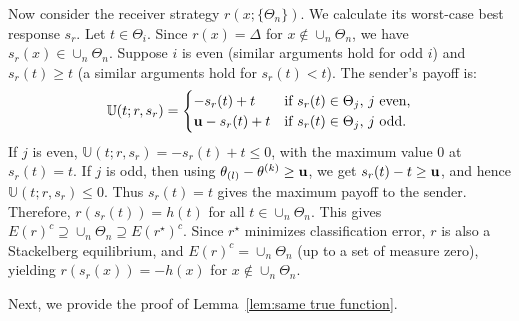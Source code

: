 \begin{apdxproof}
Now consider the receiver strategy $r(x; \{\Theta_n\})$. We calculate its worst-case best response $s_r$. Let $t \in \Theta_i$. Since $r(x) = \Delta$ for $x \notin \cup_n \Theta_n$, we have $s_r(x) \in \cup_n \Theta_n$. Suppose $i$ is even (similar arguments hold for odd $i$) and $s_r(t) \geq t$ (a similar arguments hold for $s_r(t) < t$). The sender's payoff is:
\[
\mathbb{U}(t; r, s_r) = 
\begin{cases}
-s_r(t) + t & \text{if } s_r(t) \in \Theta_j, \, j \text{ even}, \\
\mathbf{u} - s_r(t) + t & \text{if } s_r(t) \in \Theta_j, \, j \text{ odd}.
\end{cases}
\]
If $j$ is even, $\mathbb{U}(t; r, s_r) = -s_r(t) + t \leq 0$, with the maximum value $0$ at $s_r(t) = t$. If $j$ is odd, then using $\theta_{(l)} - \theta^{(k)} \geq \mathbf{u}$, we get $s_r(t) - t \geq \mathbf{u}$, and hence $\mathbb{U}(t; r, s_r) \leq 0$. Thus $s_r(t) = t$ gives the maximum payoff to the sender. Therefore, $r(s_r(t)) = h(t)$ for all $t \in \cup_n \Theta_n$. This gives $E(r)^c \supseteq \cup_n \Theta_n \supseteq E(r^\star)^c$. Since $r^\star$ minimizes classification error, $r$ is also a Stackelberg equilibrium, and $E(r)^c = \cup_n \Theta_n$ (up to a set of measure zero), yielding $r(s_r(x)) = -h(x)$ for $x \notin \cup_n \Theta_n$.
\end{apdxproof}

Next, we provide the proof of Lemma~\ref{lem:same true function}.

